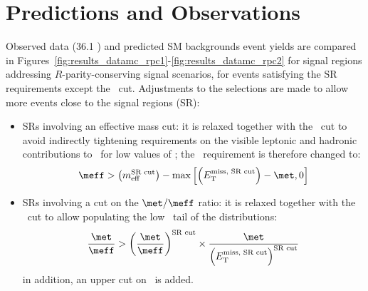 \section{Predictions and Observations}

Observed data (36.1 \ifb) and predicted SM backgrounds event yields 
are compared in Figures~\ref{fig:results_datamc_rpc1}-\ref{fig:results_datamc_rpc2} for signal regions addressing $R$-parity-conserving signal scenarios, 
for events satisfying the SR requirements except the \met\ cut. Adjustments to the selections are made to allow more events close to the signal regions (SR): 
\begin{itemize}
\item SRs involving an effective mass cut: it is relaxed 
together with the \met\ cut to avoid indirectly tightening requirements 
on the visible leptonic and hadronic contributions to \meff\ for low values of \met; 
the \meff\ requirement is therefore changed to:
$$
\meff > \left(m_\mathrm{eff}^\text{SR cut}\right) - \operatorname{max}\left[\left(E_\mathrm{T}^\text{miss, SR cut}\right)-\met,0\right]
$$
\item SRs involving a cut on the $\met/\meff$ ratio: it is relaxed together with the \met\ cut 
to allow populating the low \met\ tail of the distributions: 
$$
\frac{\met}{\meff} > \left(\frac{\met}{\meff}\right)^\text{SR cut}\times \frac{\met}{\left(E_\mathrm{T}^\text{miss, SR cut}\right)^\text{SR cut}}
$$
in addition, an upper cut on \meff\ is added. 
\end{itemize}

